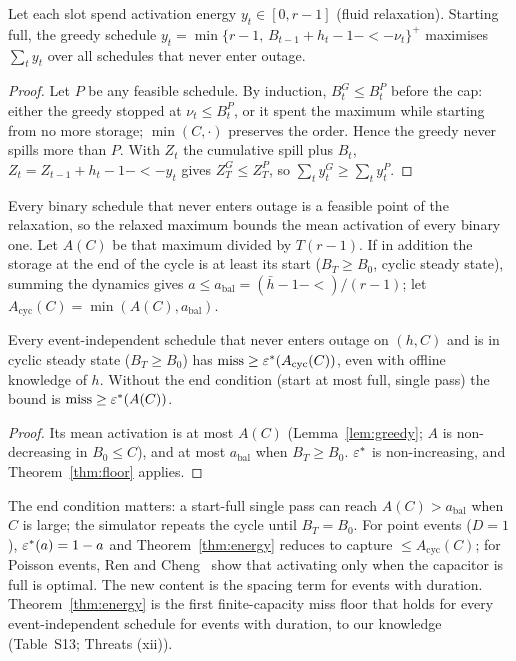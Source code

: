 \begin{lemma}\label{lem:greedy}
Let each slot spend activation energy $y_t\in[0,r-1]$ (fluid relaxation). Starting full, the greedy schedule $y_t=\min\{r-1,\,B_{t-1}+h_t-1-\lt-\nu_t\}^+$ maximises $\sum_ty_t$ over all schedules that never enter outage.
\end{lemma}
\begin{proof}
Let $P$ be any feasible schedule. By induction, $B^G_t\le B^P_t$ before the cap: either the greedy stopped at $\nu_t\le B^P_t$, or it spent the maximum while starting from no more storage; $\min(C,\cdot)$ preserves the order. Hence the greedy never spills more than $P$. With $Z_t$ the cumulative spill plus $B_t$, $Z_t=Z_{t-1}+h_t-1-\lt-y_t$ gives $Z^G_T\le Z^P_T$, so $\sum_ty^G_t\ge\sum_ty^P_t$.
\end{proof}
\noindent Every binary schedule that never enters outage is a feasible point of the relaxation, so the relaxed maximum bounds the mean activation of every binary one. Let $A(C)$ be that maximum divided by $T(r-1)$. If in addition the storage at the end of the cycle is at least its start ($B_T\ge B_0$, cyclic steady state), summing the dynamics gives $a\le a_{\mathrm{bal}}=(\bar h-1-\lt)/(r-1)$; let $A_{\mathrm{cyc}}(C)=\min(A(C),a_{\mathrm{bal}})$.

\begin{theorem}\label{thm:energy}
Every event-independent schedule that never enters outage on $(h,C)$ and is in cyclic steady state ($B_T\ge B_0$) has $\mathrm{miss}\ge\varepsilon^*(A_{\mathrm{cyc}}(C))$, even with offline knowledge of $h$. Without the end condition (start at most full, single pass) the bound is $\mathrm{miss}\ge\varepsilon^*(A(C))$.
\end{theorem}
\begin{proof}
Its mean activation is at most $A(C)$ (Lemma~\ref{lem:greedy}; $A$ is non-decreasing in $B_0\le C$), and at most $a_{\mathrm{bal}}$ when $B_T\ge B_0$. $\varepsilon^*$ is non-increasing, and Theorem~\ref{thm:floor} applies.
\end{proof}
\noindent The end condition matters: a start-full single pass can reach $A(C)>a_{\mathrm{bal}}$ when $C$ is large; the simulator repeats the cycle until $B_T=B_0$. For point events ($D=1$), $\varepsilon^*(a)=1-a$ and Theorem~\ref{thm:energy} reduces to capture $\le A_{\mathrm{cyc}}(C)$; for Poisson events, Ren and Cheng~\cite{ren2015p2p} show that activating only when the capacitor is full is optimal. The new content is the spacing term for events with duration. Theorem~\ref{thm:energy} is the first finite-capacity miss floor that holds for every event-independent schedule for events with duration, to our knowledge (Table~S13; Threats (xii)).

